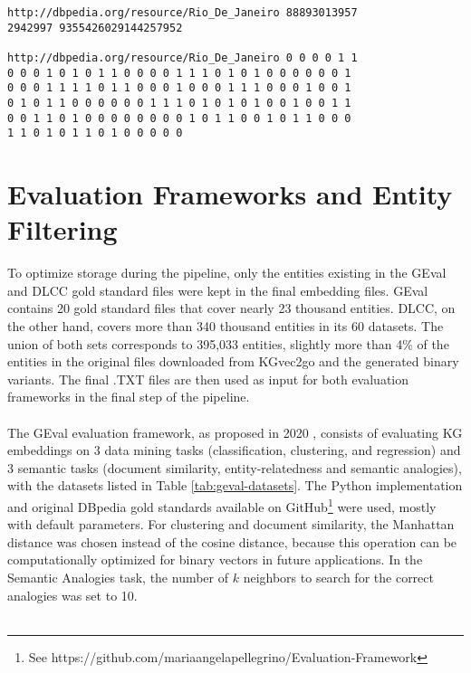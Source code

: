\documentclass[11pt,titlepage,oneside,openany]{book}
\begin{document}
\begin{verbatim}
http://dbpedia.org/resource/Rio_De_Janeiro 88893013957
2942997 9355426029144257952

http://dbpedia.org/resource/Rio_De_Janeiro 0 0 0 0 1 1
0 0 0 1 0 1 0 1 1 0 0 0 0 1 1 1 0 1 0 1 0 0 0 0 0 0 1
0 0 0 1 1 1 1 0 1 1 0 0 0 1 0 0 0 1 1 1 0 0 0 1 0 0 1
0 1 0 1 1 0 0 0 0 0 0 1 1 1 0 1 0 1 0 1 0 0 1 0 0 1 1
0 0 1 1 0 1 0 0 0 0 0 0 0 0 1 0 1 1 0 0 1 0 1 1 0 0 0
1 1 0 1 0 1 1 0 1 0 0 0 0 0
\end{verbatim}


\section{Evaluation Frameworks and Entity Filtering}
\label{sec:eval-ent-filt}

To optimize storage during the pipeline, only the entities existing in the GEval and DLCC gold standard files were kept in the final embedding files. GEval contains 20 gold standard files that cover nearly 23 thousand entities. DLCC, on the other hand, covers more than 340 thousand entities in its 60 datasets. The union of both sets corresponds to 395,033 entities, slightly more than 4\% of the entities in the original files downloaded from KGvec2go and the generated binary variants. The final \textsc{.TXT} files are then used as input for both evaluation frameworks in the final step of the pipeline.\\
\\
The GEval evaluation framework, as proposed in 2020 \cite{pellegrino_geval_2020}, consists of evaluating KG embeddings on 3 data mining tasks (classification, clustering, and regression) and 3 semantic tasks (document similarity, entity-relatedness and semantic analogies), with the datasets listed in Table \ref{tab:geval-datasets}. The Python implementation and original DBpedia gold standards available on GitHub\footnote{See https://github.com/mariaangelapellegrino/Evaluation-Framework} were used, mostly with default parameters. For clustering and document similarity, the Manhattan distance was chosen instead of the cosine distance, because this operation can be computationally optimized for binary vectors in future applications. In the Semantic Analogies task, the number of $k$ neighbors to search for the correct analogies was set to 10.\\
\\
\end{document}
